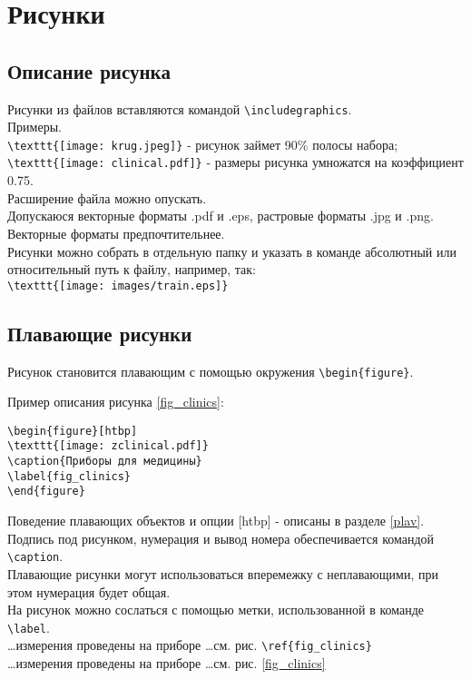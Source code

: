 \chapter{Рисунки}

\section{Описание рисунка}

Рисунки из файлов вставляются командой \verb|\includegraphics|.\\
Примеры.\\
\verb|\texttt{[image: krug.jpeg]}| - рисунок займет 90\% полосы набора;\\
\verb|\texttt{[image: clinical.pdf]}| - размеры рисунка умножатся на коэффициент 0.75.\\
Расширение файла можно опускать.\\
Допускаюся векторные форматы .pdf и .eps, растровые форматы .jpg и .png. Векторные форматы предпочтительнее.\\
Рисунки можно собрать в отдельную папку и указать в команде абсолютный или относительный путь к файлу, например, так:\\
\verb|\texttt{[image: images/train.eps]}|\\

\section{Плавающие рисунки}

Рисунок становится плавающим с помощью окружения \verb|\begin{figure}|. 

Пример описания рисунка \ref{fig_clinics}:
\begin{verbatim}
\begin{figure}[htbp]
\texttt{[image: zclinical.pdf]}
\caption{Приборы для медицины}
\label{fig_clinics}
\end{figure}
\end{verbatim}


Поведение плавающих объектов и опции [htbp] - описаны в разделе \ref{plav}. Подпись под рисунком, нумерация и вывод номера обеспечивается командой \verb|\caption|. \\
Плавающие рисунки могут использоваться вперемежку с неплавающими, при этом нумерация будет общая.\\
На рисунок можно сослаться с помощью метки, использованной в команде \verb|\label|.\\
\ldots измерения проведены на приборе \ldots см. рис. \verb|\ref{fig_clinics}|\\
\ldots измерения проведены на приборе \ldots см. рис. \ref{fig_clinics}

